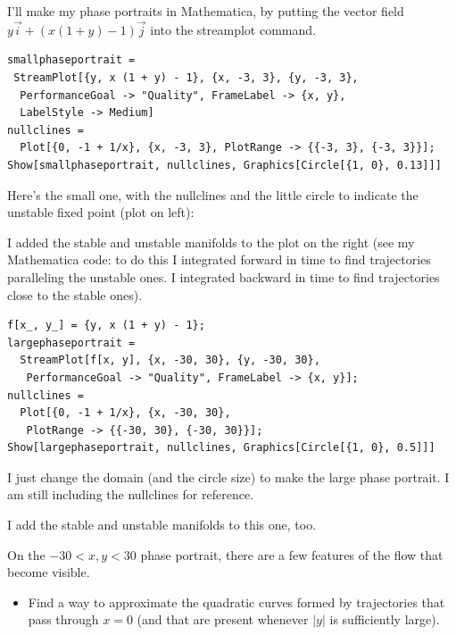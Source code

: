 \documentclass[12pt,letterpaper]{exam}
\begin{document}
\begin{questions}
\begin{parts}
\begin{solution}
I'll make my phase portraits in Mathematica, by putting the vector field $y\vec i + (x(1+y)-1)\vec j$ into the streamplot command.

\begin{verbatim}
smallphaseportrait = 
 StreamPlot[{y, x (1 + y) - 1}, {x, -3, 3}, {y, -3, 3}, 
  PerformanceGoal -> "Quality", FrameLabel -> {x, y}, 
  LabelStyle -> Medium]
nullclines = 
  Plot[{0, -1 + 1/x}, {x, -3, 3}, PlotRange -> {{-3, 3}, {-3, 3}}];
Show[smallphaseportrait, nullclines, Graphics[Circle[{1, 0}, 0.13]]]
\end{verbatim}

Here's the small one, with the nullclines and the little circle to indicate the unstable fixed point (plot on left):


I added the stable and unstable manifolds to the plot on the right (see my Mathematica code: to do this I integrated forward in time to find trajectories paralleling the unstable ones.  I integrated backward in time to find trajectories close to the stable ones).



\eject

\begin{verbatim}
f[x_, y_] = {y, x (1 + y) - 1};
largephaseportrait = 
  StreamPlot[f[x, y], {x, -30, 30}, {y, -30, 30}, 
   PerformanceGoal -> "Quality", FrameLabel -> {x, y}];
nullclines = 
  Plot[{0, -1 + 1/x}, {x, -30, 30}, 
   PlotRange -> {{-30, 30}, {-30, 30}}];
Show[largephaseportrait, nullclines, Graphics[Circle[{1, 0}, 0.5]]]
\end{verbatim}

I just change the domain (and the circle size) to make the large phase portrait.  I am still including the nullclines for reference.


I add the stable and unstable manifolds to this one, too.



\end{solution}


\item On the $-30<x,y<30$ phase portrait, there are a few features of the flow that become visible.  
\begin{itemize}
    \item Find a way to approximate the quadratic curves formed by trajectories that pass through $x=0$ (and that are present whenever $\vert y\vert$ is sufficiently large).
    

\end{itemize}
\end{parts}
\end{questions}
\end{document}
